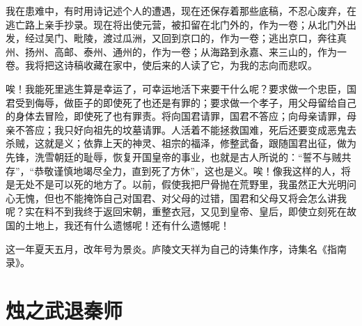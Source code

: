 \documentclass[12pt,UTF-8,openany,a4]{ctexbook}
\begin{document}
\begin{large}
    我在患难中，有时用诗记述个人的遭遇，现在还保存着那些底稿，不忍心废弃，在逃亡路上亲手抄录。现在将出使元营，被扣留在北门外的，作为一卷；从北门外出发，经过吴门、毗陵，渡过瓜洲，又回到京口的，作为一卷；逃出京口，奔往真州、扬州、高邮、泰州、通州的，作为一卷；从海路到永嘉、来三山的，作为一卷。我将把这诗稿收藏在家中，使后来的人读了它，为我的志向而悲叹。
    
    唉！我能死里逃生算是幸运了，可幸运地活下来要干什么呢？要求做一个忠臣，国君受到侮辱，做臣子的即使死了也还是有罪的；要求做一个孝子，用父母留给自己的身体去冒险，即使死了也有罪责。将向国君请罪，国君不答应；向母亲请罪，母亲不答应；我只好向祖先的坟墓请罪。人活着不能拯救国难，死后还要变成恶鬼去杀贼，这就是义；依靠上天的神灵、祖宗的福泽，修整武备，跟随国君出征，做为先锋，洗雪朝廷的耻辱，恢复开国皇帝的事业，也就是古人所说的：“誓不与贼共存”，“恭敬谨慎地竭尽全力，直到死了方休”，这也是义。唉！像我这样的人，将是无处不是可以死的地方了。以前，假使我把尸骨抛在荒野里，我虽然正大光明问心无愧，但也不能掩饰自己对国君、对父母的过错，国君和父母又将会怎么讲我呢？实在料不到我终于返回宋朝，重整衣冠，又见到皇帝、皇后，即使立刻死在故国的土地上，我还有什么遗憾呢！还有什么遗憾呢！
    
    这一年夏天五月，改年号为景炎。庐陵文天祥为自己的诗集作序，诗集名《指南录》。
    

\end{large}




\chapter{烛之武退秦师}
\end{document}
